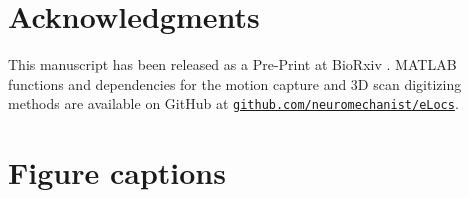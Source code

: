 \documentclass{UCF_ETD}
\newcommand{\ignore}[1]{}
\renewcommand{\ul}{}
\begin{document}
\section*{Acknowledgments}
This manuscript has been released as a Pre-Print at BioRxiv \citep{Shirazi2019-hf}.\ul{ MATLAB functions and dependencies for the motion capture and 3D scan digitizing methods are available on GitHub at {\tt \href{https://github.com/neuromechanist/eLocs}{github.com/neuromechanist/eLocs}}}.

\ignore{\section*{Data Availability Statement}
MATLAB functions and scripts for motion capture, motion capture probe and 3D scan digitizations are publicly available at \url{https://github.com/neuromechanist/easy_digitization}. Brodmann area accuracy functions with a sample data structure for select ICs are available at \url{https://github.com/neuromechanist/baa}.}




\section*{Figure captions}
\end{document}
